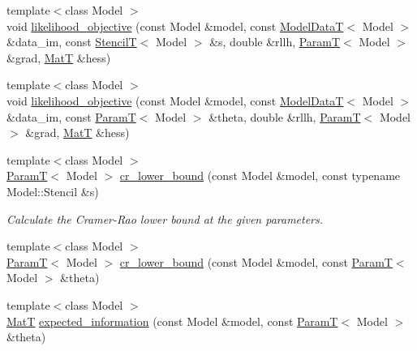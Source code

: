 \begin{DoxyCompactItemize}
\item 
{\footnotesize template$<$class Model $>$ }\\void \hyperlink{namespacemappel_1_1methods_a82eaea0b938b0daff819da153e1351e2}{likelihood\+\_\+objective} (const Model \&model, const \hyperlink{namespacemappel_a97f050df953605381ae9c901c3b125f1}{Model\+DataT}$<$ Model $>$ \&data\+\_\+im, const \hyperlink{namespacemappel_a3a06598240007876f8c4bf834ad86197}{StencilT}$<$ Model $>$ \&s, double \&rllh, \hyperlink{namespacemappel_a667925cb0d6c0e49f2f035cc5a9a6857}{ParamT}$<$ Model $>$ \&grad, \hyperlink{namespacemappel_a7091ab87c528041f7e2027195fad8915}{MatT} \&hess)
\item 
{\footnotesize template$<$class Model $>$ }\\void \hyperlink{namespacemappel_1_1methods_a496d45e1db23f89b54ae0bef016a19b0}{likelihood\+\_\+objective} (const Model \&model, const \hyperlink{namespacemappel_a97f050df953605381ae9c901c3b125f1}{Model\+DataT}$<$ Model $>$ \&data\+\_\+im, const \hyperlink{namespacemappel_a667925cb0d6c0e49f2f035cc5a9a6857}{ParamT}$<$ Model $>$ \&theta, double \&rllh, \hyperlink{namespacemappel_a667925cb0d6c0e49f2f035cc5a9a6857}{ParamT}$<$ Model $>$ \&grad, \hyperlink{namespacemappel_a7091ab87c528041f7e2027195fad8915}{MatT} \&hess)
\item 
{\footnotesize template$<$class Model $>$ }\\\hyperlink{namespacemappel_a667925cb0d6c0e49f2f035cc5a9a6857}{ParamT}$<$ Model $>$ \hyperlink{namespacemappel_1_1methods_ac1fe2927bc882d9a76138010f41df115}{cr\+\_\+lower\+\_\+bound} (const Model \&model, const typename Model\+::\+Stencil \&s)
\begin{DoxyCompactList}\small\item\em Calculate the Cramer-\/\+Rao lower bound at the given parameters. \end{DoxyCompactList}\item 
{\footnotesize template$<$class Model $>$ }\\\hyperlink{namespacemappel_a667925cb0d6c0e49f2f035cc5a9a6857}{ParamT}$<$ Model $>$ \hyperlink{namespacemappel_1_1methods_a30d0f08f37d8f412a2677280cb39c588}{cr\+\_\+lower\+\_\+bound} (const Model \&model, const \hyperlink{namespacemappel_a667925cb0d6c0e49f2f035cc5a9a6857}{ParamT}$<$ Model $>$ \&theta)
\item 
{\footnotesize template$<$class Model $>$ }\\\hyperlink{namespacemappel_a7091ab87c528041f7e2027195fad8915}{MatT} \hyperlink{namespacemappel_1_1methods_a6632adc36d8b32fd8d198669e268c767}{expected\+\_\+information} (const Model \&model, const \hyperlink{namespacemappel_a667925cb0d6c0e49f2f035cc5a9a6857}{ParamT}$<$ Model $>$ \&theta)

\end{DoxyCompactItemize}
